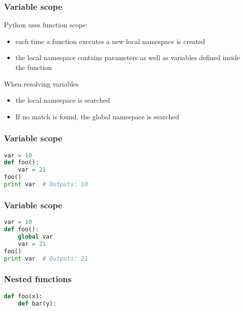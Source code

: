 \documentclass{beamer}
\begin{document}
\begin{frame}[fragile]
\frametitle{Variable scope}
Python uses function scope:
\begin{itemize}
 \item each time a function executes a new local namespace is created
 \item the local namespace contains parameters as well as variables defined inside the function
\end{itemize}
\vspace{5 mm}
When resolving variables
\begin{itemize}
  \item the local namespace is searched
  \item If no match is found, the global namespace is searched  
\end{itemize}

\end{frame}

\begin{frame}[fragile]
\frametitle{Variable scope}
\begin{lstlisting}[language=python]
var = 10
def foo():
    var = 21
foo()
print var  # Outputs: 10
\end{lstlisting}
\end{frame}

\begin{frame}[fragile]
\frametitle{Variable scope}
\begin{lstlisting}[language=python]
var = 10
def foo():
    global var
    var = 21
foo()
print var  # Outputs: 21
\end{lstlisting}
\end{frame}


\begin{frame}[fragile]
\frametitle{Nested functions}
\begin{lstlisting}[language=python]
def foo(x):
    def bar(y):
        
\end{lstlisting}
\end{frame}
\end{document}
